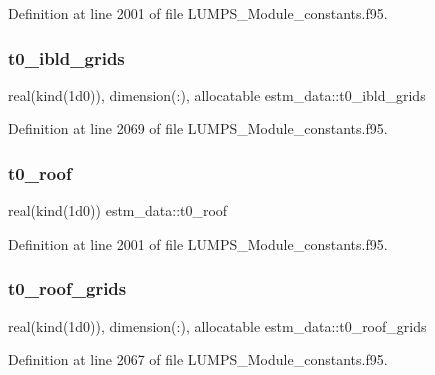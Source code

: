 Definition at line 2001 of file L\+U\+M\+P\+S\+\_\+\+Module\+\_\+constants.\+f95.

\mbox{\label{namespaceestm__data_a746501ddba4d45a49ef9a65f7e668cd8}} 
\subsubsection{\texorpdfstring{t0\+\_\+ibld\+\_\+grids}{t0\_ibld\_grids}}
{\footnotesize\ttfamily real(kind(1d0)), dimension(\+:), allocatable estm\+\_\+data\+::t0\+\_\+ibld\+\_\+grids}



Definition at line 2069 of file L\+U\+M\+P\+S\+\_\+\+Module\+\_\+constants.\+f95.

\mbox{\label{namespaceestm__data_a4d8c08047c27c858357a35947aa2cc8d}} 
\subsubsection{\texorpdfstring{t0\+\_\+roof}{t0\_roof}}
{\footnotesize\ttfamily real(kind(1d0)) estm\+\_\+data\+::t0\+\_\+roof}



Definition at line 2001 of file L\+U\+M\+P\+S\+\_\+\+Module\+\_\+constants.\+f95.

\mbox{\label{namespaceestm__data_a78c65d6ac3d89929a7ca5e553a486600}} 
\subsubsection{\texorpdfstring{t0\+\_\+roof\+\_\+grids}{t0\_roof\_grids}}
{\footnotesize\ttfamily real(kind(1d0)), dimension(\+:), allocatable estm\+\_\+data\+::t0\+\_\+roof\+\_\+grids}



Definition at line 2067 of file L\+U\+M\+P\+S\+\_\+\+Module\+\_\+constants.\+f95.

